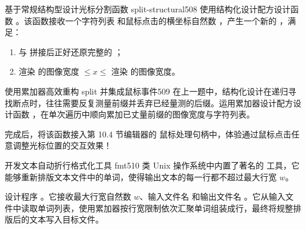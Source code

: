 \begin{exercise}{基于常规结构型设计光标分割函数 split-structural}{508}
使用结构化设计配方设计函数 。该函数接收一个字符列表  和鼠标点击的横坐标自然数 ，产生一个新的 ，满足：
\begin{enumerate}
  \item {} 与  拼接后正好还原完整的 ；
  \item 渲染  的图像宽度 $\le x \le$ 渲染  的图像宽度。
\end{enumerate}
\end{exercise}

\begin{exercise}{使用累加器高效重构 split 并集成鼠标事件}{509}
在上一题中，结构化设计在递归寻找断点时，往往需要反复测量前缀并丢弃已经量测的后缀。运用累加器设计配方设计函数 ，在单次遍历中顺向累加已丈量前缀的图像宽度与字符列表。

完成后，将该函数接入第 10.4 节编辑器的  鼠标处理句柄中，体验通过鼠标点击任意调整光标位置的交互效果！
\end{exercise}

\begin{exercise}{开发文本自动折行格式化工具 fmt}{510}
类 Unix 操作系统中内置了著名的  工具，它能够重新排版文本文件中的单词，使得输出文本的每一行都不超过最大行宽 $w$。

设计程序 。它接收最大行宽自然数 $w$、输入文件名  和输出文件名 。它从输入文件中读取单词列表，使用累加器按行宽限制依次汇聚单词组装成行，最终将规整排版后的文本写入目标文件。
\end{exercise}
